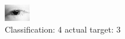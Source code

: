 \begin{figure}[h!]
\begin{center}
\includegraphics[width=0.60\columnwidth]{figures/ID154_class_4_target_3.png}
\end{center}
\caption{ Classification: 4 actual target: 3}
\label{fig:ID154_class_4_target_3}
\end{figure}
